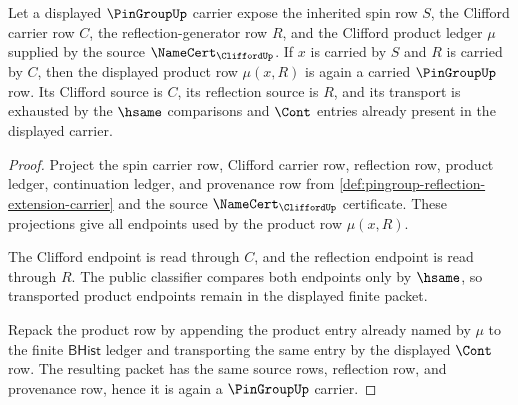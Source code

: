 \begin{theorem}
\label{thm:pingroup-clifford-reflection-product-closure}
Let a displayed $\PinGroupUp$ carrier expose the inherited spin row $S$, the
Clifford carrier row $C$, the reflection-generator row $R$, and the Clifford
product ledger $\mu$ supplied by the source $\NameCert_{\CliffordUp}$. If $x$
is carried by $S$ and $R$ is carried by $C$, then the displayed product row
$\mu(x,R)$ is again a carried $\PinGroupUp$ row. Its Clifford source is $C$,
its reflection source is $R$, and its transport is exhausted by the $\hsame$
comparisons and $\Cont$ entries already present in the displayed carrier.
\end{theorem}
\begin{proof}
Project the spin carrier row, Clifford carrier row, reflection row, product
ledger, continuation ledger, and provenance row from
\autoref{def:pingroup-reflection-extension-carrier} and the source
$\NameCert_{\CliffordUp}$ certificate. These projections give all endpoints
used by the product row $\mu(x,R)$.

The Clifford endpoint is read through $C$, and the reflection endpoint is read
through $R$. The public classifier compares both endpoints only by $\hsame$,
so transported product endpoints remain in the displayed finite packet.

Repack the product row by appending the product entry already named by $\mu$ to
the finite $\mathsf{BHist}$ ledger and transporting the same entry by the
displayed $\Cont$ row. The resulting packet has the same source rows,
reflection row, and provenance row, hence it is again a $\PinGroupUp$ carrier.
\end{proof}

